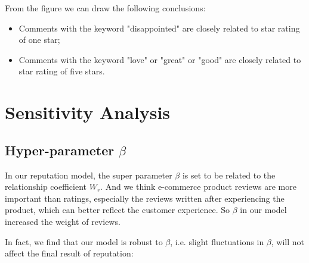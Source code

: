 \documentclass{mcmthesis}
\begin{document}
From the figure we can draw the following conclusions:
\begin{itemize}
	\item Comments with the keyword "disappointed" are closely related to star rating of one star;
	\item Comments with the keyword "love" or "great" or "good" are closely related to star rating of five stars.
\end{itemize}


\section{Sensitivity Analysis}
\subsection{Hyper-parameter $\beta$}
In our reputation model, the super parameter $\beta$ is set to be related to the relationship coefficient $W_{r}$. And we think e-commerce product reviews are more important than ratings\cite{zhang2006lord}, especially the reviews written after experiencing the product, which can better reflect the customer experience. So $\beta$ in our model increased the weight of reviews.

In fact, we find that our model is robust to $\beta$, i.e. slight fluctuations in $\beta$, will not affect the final result of reputation:
\end{document}

